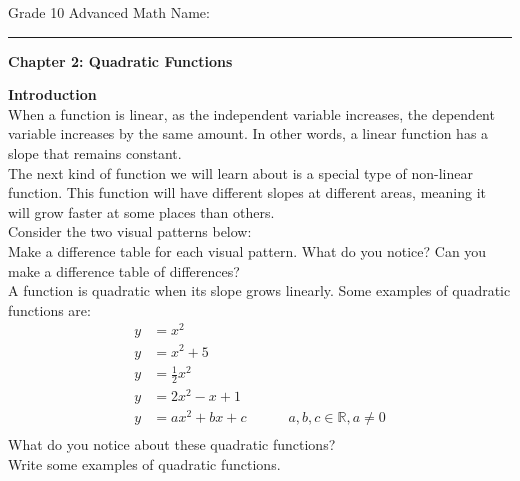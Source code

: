 \documentclass[12pt,fleqn]{book}
\begin{document}
\noindent
\thispagestyle{empty}
Grade 10 Advanced Math \hfill Name: \hspace{2in}
\medskip\hrule
\noindent

\vfill

\begin{center}
	{\bf \huge Chapter 2: Quadratic Functions}
\end{center}

\vfill
\vfill

\clearpage

\setcounter{page}{1}

{\bf \huge Introduction }
\\[2em]
When a function is linear, as the independent variable increases, the dependent variable increases by the same amount.  In other words, a linear function has a slope that remains constant.
\\[1em]
The next kind of function we will learn about is a special type of non-linear function.  This function will have different slopes at different areas, meaning it will grow faster at some places than others.
\\[1em]
Consider the two visual patterns below:
\\[3in]
Make a difference table for each visual pattern.  What do you notice?  Can you make a difference table of differences?
\\[1em]
A function is quadratic when its slope grows linearly.  Some examples of quadratic functions are:
\begin{align*}
	y & =x^2                                                      \\
	y & =x^2+5                                                    \\
	y & =\frac 12 x^2                                             \\
	y & =2x^2 - x + 1                                             \\
	y & =ax^2 + bx + c \quad\quad\quad a,b,c\in \mathbb R, a\ne 0 \\
\end{align*}
What do you notice about these quadratic functions?\\[1in]
Write some examples of quadratic functions.
\clearpage
\end{document}
